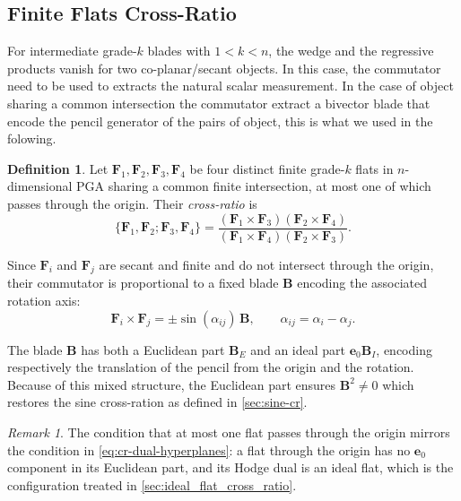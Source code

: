 \documentclass{birkjour}
\theoremstyle{definition}
\newtheorem{definition}[theorem]{Definition}
\theoremstyle{remark}
\newtheorem{remark}[theorem]{Remark}
\begin{document}
\subsection{Finite Flats Cross-Ratio}
\label{sec:finite_flat_cross_ratio}
For intermediate grade-$k$ blades with $1 < k < n$, the wedge and the regressive products vanish for two co-planar/secant objects. In this case, the commutator need to be used to extracts the natural scalar measurement. In the case of object sharing a common intersection the commutator extract a bivector blade that encode the pencil generator of the pairs of object, this is what we used in the folowing.

\begin{definition}
\label{def:cr-finite-flats}
Let $\mathbf{F}_1, \mathbf{F}_2, \mathbf{F}_3, \mathbf{F}_4$ be four distinct finite grade-$k$ flats in $n$-dimensional PGA sharing a common finite intersection, at most one of which passes through the origin. Their \emph{cross-ratio} is
\begin{equation}
  \{\mathbf{F}_1, \mathbf{F}_2; \mathbf{F}_3, \mathbf{F}_4\}
  =
  \frac{(\mathbf{F}_1 \times \mathbf{F}_3)
        (\mathbf{F}_2 \times \mathbf{F}_4)}
       {(\mathbf{F}_1 \times \mathbf{F}_4)
        (\mathbf{F}_2 \times \mathbf{F}_3)}.
  \label{eq:cr-finite-flats}
\end{equation}
\end{definition}

Since $\mathbf{F}_i$ and $\mathbf{F}_j$ are secant and finite and do not intersect through the origin, their commutator is proportional to a fixed blade $\mathbf{B}$ encoding the associated rotation axis:
\begin{equation}
  \mathbf{F}_i \times \mathbf{F}_j
  = \pm\sin(\alpha_{ij})\,\mathbf{B},
  \qquad \alpha_{ij} = \alpha_i - \alpha_j.
\end{equation}

The blade $\mathbf{B}$ has both a Euclidean part $\mathbf{B}_E$ and an ideal part $\mathbf{e}_0\mathbf{B}_I$, encoding respectively the translation of the pencil from the origin and the rotation. Because of this mixed structure, the Euclidean part ensures $\mathbf{B}^2 \neq 0$ which restores the sine cross-ration as defined in \cref{sec:sine-cr}.

\begin{remark}
The condition that at most one flat passes through the origin mirrors the condition in \eqref{eq:cr-dual-hyperplanes}: a flat through the origin has no $\mathbf{e}_0$ component in its Euclidean part, and its Hodge dual is an ideal flat, which is the configuration treated in \cref{sec:ideal_flat_cross_ratio}.
\end{remark}
\end{document}
